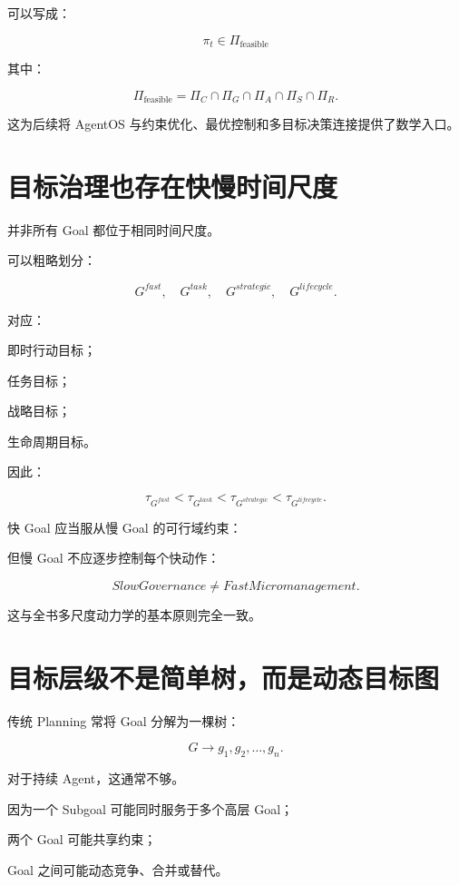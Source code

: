 可以写成：

\[
\pi_t
\in
\Pi_{\mathrm{feasible}}
\]

其中：

\[
\Pi_{\mathrm{feasible}}
=
\Pi_C
\cap
\Pi_G
\cap
\Pi_A
\cap
\Pi_S
\cap
\Pi_R.
\]

这为后续将 AgentOS 与约束优化、最优控制和多目标决策连接提供了数学入口。


\section{目标治理也存在快慢时间尺度}

并非所有 Goal 都位于相同时间尺度。

可以粗略划分：

\[
G^{fast},
\quad
G^{task},
\quad
G^{strategic},
\quad
G^{lifecycle}.
\]

对应：

即时行动目标；

任务目标；

战略目标；

生命周期目标。

因此：

\[
\tau_{G^{fast}}
<
\tau_{G^{task}}
<
\tau_{G^{strategic}}
<
\tau_{G^{lifecycle}}.
\]

快 Goal 应当服从慢 Goal 的可行域约束：

\begin{statementbox}
\centering
{}
\end{statementbox}

但慢 Goal 不应逐步控制每个快动作：

\[
\boxed{
SlowGovernance
\neq
FastMicromanagement.
}
\]

这与全书多尺度动力学的基本原则完全一致。


\section{目标层级不是简单树，而是动态目标图}

传统 Planning 常将 Goal 分解为一棵树：

\[
G
\rightarrow
g_1,g_2,\dots,g_n.
\]

对于持续 Agent，这通常不够。

因为一个 Subgoal 可能同时服务于多个高层 Goal；

两个 Goal 可能共享约束；

Goal 之间可能动态竞争、合并或替代。

